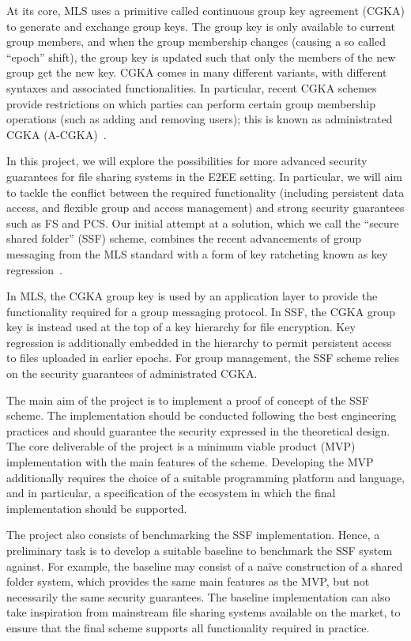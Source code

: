 \documentclass[E]{BAMASA}
\begin{document}
At its core, MLS uses a primitive called continuous group key agreement (CGKA) to generate and exchange group keys.
The group key is only available to current group members, and when the group membership changes (causing a so called ``epoch'' shift), the group key is updated such that only the members of the new group get the new key.
CGKA comes in many different variants, with different syntaxes and associated functionalities.
In particular, recent CGKA schemes provide restrictions on which parties can perform certain group membership operations (such as adding and removing users);
this is known as administrated CGKA (A-CGKA)~\cite{USENIX:BalColVau23}.

In this project, we will explore the possibilities for more advanced security guarantees for file sharing systems in the E2EE setting.
In particular, we will aim to tackle the conflict between the required functionality (including persistent data access, and flexible group and access management) and strong security guarantees such as FS and PCS.
Our initial attempt at a solution, which we call the ``secure shared folder'' (SSF) scheme, combines the recent advancements of group messaging from the MLS standard with a form of key ratcheting known as key regression~\cite{NDSS:FuKamKoh06}.

In MLS, the CGKA group key is used by an application layer to provide the functionality required for a group messaging protocol.
In SSF, the CGKA group key is instead used at the top of a key hierarchy for file encryption.
Key regression is additionally embedded in the hierarchy to permit persistent access to files uploaded in earlier epochs. 
For group management, the SSF scheme relies on the security guarantees of administrated CGKA.


\desc
The main aim of the project is to implement a proof of concept of the SSF scheme.
The implementation should be conducted following the best engineering practices 
and should guarantee the security expressed in the theoretical design.
The core deliverable of the project is a minimum viable product (MVP) implementation with the main features of the scheme.
Developing the MVP additionally requires the choice of a suitable programming platform and language, and in particular, a specification of the ecosystem in which the final implementation should be supported.

The project also consists of benchmarking the SSF implementation.
Hence, a preliminary task is to develop a suitable baseline to benchmark the SSF system against.
For example, the baseline may consist of a na\"ive construction of a shared folder system, which provides the same main features as the MVP, but not necessarily the same security guarantees.
The baseline implementation can also take inspiration from mainstream file sharing systems available on the market, to ensure that the final scheme supports all functionality required in practice.
\end{document}

